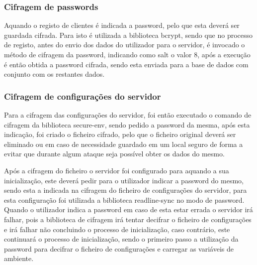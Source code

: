 \subsubsection{Cifragem de passwords\\}
Aquando o registo de clientes é indicada a password, pelo que esta deverá ser guardada cifrada. Para isto é utilizada a biblioteca bcrypt, sendo que no processo de registo, antes do envio dos dados do utilizador para o servidor, é invocado o método de cifragem da password, indicando como salt o valor 8, após a execução é então obtida a password cifrada, sendo esta enviada para a base de dados com conjunto com os restantes dados.

\subsubsection{Cifragem de configurações do servidor\\}
Para a cifragem das configurações do servidor, foi então executado o comando de cifragem da biblioteca secure-env, sendo pedido a password da mesma, após esta indicação, foi criado o ficheiro cifrado, pelo que o ficheiro original deverá ser eliminado ou em caso de necessidade guardado em um local seguro de forma a evitar que durante algum ataque seja possível obter os dados do mesmo.

Após a cifragem do ficheiro o servidor foi configurado para aquando a sua inicialização, este deverá pedir para o utilizador indicar a password do mesmo, sendo esta a indicada na cifragem do ficheiro de configurações do servidor, para esta configuração foi utilizada a biblioteca readline-sync no modo de password. Quando o utilizador indica a password em caso de esta estar errada o servidor irá falhar, pois a biblioteca de cifragem irá tentar decifrar o ficheiro de configurações e irá falhar não concluindo o processo de inicialização, caso contrário, este continuará o processo de inicialização, sendo o primeiro passo a utilização da password para decifrar o ficheiro de configurações e carregar as variáveis de ambiente.